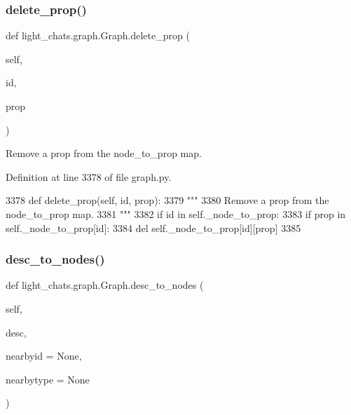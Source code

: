 \mbox{\label{classlight__chats_1_1graph_1_1Graph_ac98ed988f74d9571e195aa9592f84b76}} 
\subsubsection{\texorpdfstring{delete\+\_\+prop()}{delete\_prop()}}
{\footnotesize\ttfamily def light\+\_\+chats.\+graph.\+Graph.\+delete\+\_\+prop (\begin{DoxyParamCaption}\item[{}]{self,  }\item[{}]{id,  }\item[{}]{prop }\end{DoxyParamCaption})}

\begin{DoxyVerb}Remove a prop from the node_to_prop map.
\end{DoxyVerb}
 

Definition at line 3378 of file graph.\+py.


\begin{DoxyCode}
3378     \textcolor{keyword}{def }delete\_prop(self, id, prop):
3379         \textcolor{stringliteral}{"""}
3380 \textcolor{stringliteral}{        Remove a prop from the node\_to\_prop map.}
3381 \textcolor{stringliteral}{        """}
3382         \textcolor{keywordflow}{if} id \textcolor{keywordflow}{in} self.\_node\_to\_prop:
3383             \textcolor{keywordflow}{if} prop \textcolor{keywordflow}{in} self.\_node\_to\_prop[id]:
3384                 del self.\_node\_to\_prop[id][prop]
3385 
\end{DoxyCode}
\mbox{\label{classlight__chats_1_1graph_1_1Graph_a67fd9624112a695cd6e1a0b92ec3139b}} 
\subsubsection{\texorpdfstring{desc\+\_\+to\+\_\+nodes()}{desc\_to\_nodes()}}
{\footnotesize\ttfamily def light\+\_\+chats.\+graph.\+Graph.\+desc\+\_\+to\+\_\+nodes (\begin{DoxyParamCaption}\item[{}]{self,  }\item[{}]{desc,  }\item[{}]{nearbyid = {\ttfamily None},  }\item[{}]{nearbytype = {\ttfamily None} }\end{DoxyParamCaption})}

